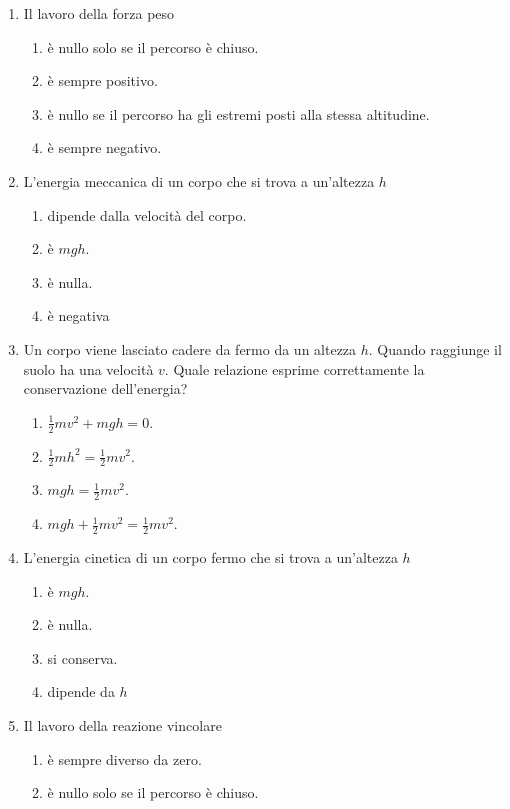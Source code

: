 \documentclass{article}
\begin{document}
\begin{enumerate}
  \item Il lavoro della forza peso
  \begin{enumerate}[label=\Alph*.]
    \item è nullo solo se il percorso è chiuso.
    \item è sempre positivo.
    \item è nullo se il percorso ha gli estremi posti alla stessa altitudine.
    \item è sempre negativo.
  \end{enumerate}
  \item L'energia meccanica di un corpo che si trova a un'altezza $h$
  \begin{enumerate}[label=\Alph*.]
    \item dipende dalla velocità del corpo.
    \item è $mgh$.
    \item è nulla.
    \item è negativa
  \end{enumerate}
  \item Un corpo viene lasciato cadere da fermo da un altezza $h$. Quando raggiunge il suolo ha una velocità $v$. Quale relazione esprime correttamente la conservazione dell'energia?
  \begin{enumerate}[label=\Alph*.]
    \item $\frac{1}{2}mv^2+mgh=0.$
    \item $\frac{1}{2}mh^2=\frac{1}{2}mv^2$.
    \item $mgh=\frac{1}{2}mv^2$.
    \item $mgh+\frac{1}{2}mv^2=\frac{1}{2}mv^2.$
  \end{enumerate}
  \item L'energia cinetica di un corpo fermo che si trova a un'altezza $h$
  \begin{enumerate}[label=\Alph*.]
    \item è $mgh$.
    \item è nulla.
    \item si conserva.
    \item dipende da $h$
  \end{enumerate}
  \item Il lavoro della reazione vincolare
  \begin{enumerate}[label=\Alph*.]
    \item è sempre diverso da zero.
    \item è nullo solo se il percorso è chiuso.

\end{enumerate}
\end{enumerate}
\end{document}

